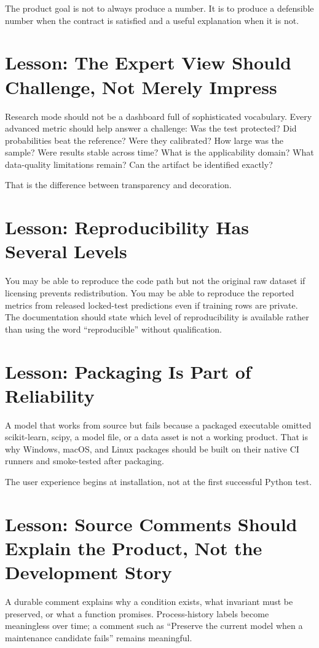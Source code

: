 \documentclass[11pt]{article}
\begin{document}
The product goal is not to always produce a number. It is to produce a defensible number when the contract is satisfied and a useful explanation when it is not.

\section{Lesson: The Expert View Should Challenge, Not Merely Impress}
Research mode should not be a dashboard full of sophisticated vocabulary. Every advanced metric should help answer a challenge: Was the test protected? Did probabilities beat the reference? Were they calibrated? How large was the sample? Were results stable across time? What is the applicability domain? What data-quality limitations remain? Can the artifact be identified exactly?

That is the difference between transparency and decoration.

\section{Lesson: Reproducibility Has Several Levels}
You may be able to reproduce the code path but not the original raw dataset if licensing prevents redistribution. You may be able to reproduce the reported metrics from released locked-test predictions even if training rows are private. The documentation should state which level of reproducibility is available rather than using the word ``reproducible'' without qualification.

\section{Lesson: Packaging Is Part of Reliability}
A model that works from source but fails because a packaged executable omitted scikit-learn, scipy, a model file, or a data asset is not a working product. That is why Windows, macOS, and Linux packages should be built on their native CI runners and smoke-tested after packaging.

The user experience begins at installation, not at the first successful Python test.

\section{Lesson: Source Comments Should Explain the Product, Not the Development Story}
A durable comment explains why a condition exists, what invariant must be preserved, or what a function promises. Process-history labels become meaningless over time; a comment such as ``Preserve the current model when a maintenance candidate fails'' remains meaningful.
\end{document}
